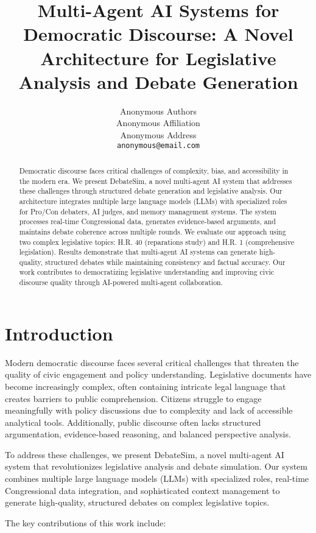 \documentclass{article}
\title{Multi-Agent AI Systems for Democratic Discourse: A Novel Architecture for Legislative Analysis and Debate Generation}
\author{%
  Anonymous Authors \\
  Anonymous Affiliation \\
  Anonymous Address \\
  \texttt{anonymous@email.com} \\
}
\begin{document}
\maketitle

\begin{abstract}
Democratic discourse faces critical challenges of complexity, bias, and accessibility in the modern era. We present DebateSim, a novel multi-agent AI system that addresses these challenges through structured debate generation and legislative analysis. Our architecture integrates multiple large language models (LLMs) with specialized roles for Pro/Con debaters, AI judges, and memory management systems. The system processes real-time Congressional data, generates evidence-based arguments, and maintains debate coherence across multiple rounds. We evaluate our approach using two complex legislative topics: H.R. 40 (reparations study) and H.R. 1 (comprehensive legislation). Results demonstrate that multi-agent AI systems can generate high-quality, structured debates while maintaining consistency and factual accuracy. Our work contributes to democratizing legislative understanding and improving civic discourse quality through AI-powered multi-agent collaboration.
\end{abstract}

\section{Introduction}

Modern democratic discourse faces several critical challenges that threaten the quality of civic engagement and policy understanding. Legislative documents have become increasingly complex, often containing intricate legal language that creates barriers to public comprehension. Citizens struggle to engage meaningfully with policy discussions due to complexity and lack of accessible analytical tools. Additionally, public discourse often lacks structured argumentation, evidence-based reasoning, and balanced perspective analysis.

To address these challenges, we present DebateSim, a novel multi-agent AI system that revolutionizes legislative analysis and debate simulation. Our system combines multiple large language models (LLMs) with specialized roles, real-time Congressional data integration, and sophisticated context management to generate high-quality, structured debates on complex legislative topics.

The key contributions of this work include:
\end{document}
